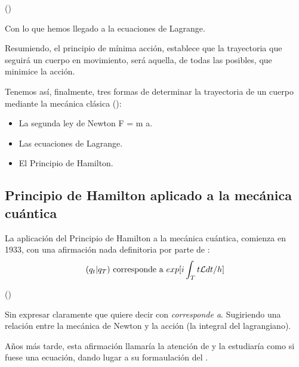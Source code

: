 (\cite{Taylor})

Con lo que hemos llegado a la ecuaciones de Lagrange.

Resumiendo, el principio de mínima acción, establece que la trayectoria que seguirá un cuerpo en movimiento, será aquella, de todas las posibles, que minimice la acción.

Tenemos así, finalmente, tres formas de determinar la trayectoria de un cuerpo mediante la mecánica clásica (\cite[264]{Taylor}):
\begin{itemize}
    \item La segunda ley de Newton F = m \cdot a.
    \item Las ecuaciones de Lagrange.
    \item El Principio de Hamilton.
\end{itemize}

\subsection{Principio de Hamilton aplicado a la mecánica cuántica}
La aplicación del Principio de Hamilton a la mecánica cuántica, comienza en 1933, con una afirmación nada definitoria por parte de :
\begin{equation}
    (q_t|q_T)\text{ corresponde a }exp[i \int_{T}{t}\mathcal{L} dt/h]
\end{equation}

(\cite{DiracLagrangian})

Sin expresar claramente que quiere decir con \textit{corresponde a}. Sugiriendo una relación entre la mecánica de Newton y la acción (la integral del lagrangiano).

Años más tarde, esta afirmación llamaría la atención de  y la estudiaría como si fuese una ecuación, dando lugar a su formaulación del .
